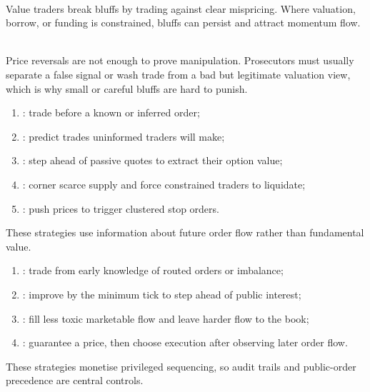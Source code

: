 \documentclass[a4paper,oneside,openany]{book}
\begin{document}
\begin{mechanism} \\
Value traders break bluffs by trading against clear mispricing. Where valuation, borrow, or funding is constrained, bluffs can persist and attract momentum flow.
\end{mechanism}

\begin{caveat} \\
Price reversals are not enough to prove manipulation. Prosecutors must usually separate a false signal or wash trade from a bad but legitimate valuation view, which is why small or careful bluffs are hard to punish.
\end{caveat}

\begin{taxonomy} 
\begin{enumerate}[label=\roman*.]
\setlength{\itemsep}{0pt}
\item {}: trade before a known or inferred order;
\item {}: predict trades uninformed traders will make;
\item {}: step ahead of passive quotes to extract their option value;
\item {}: corner scarce supply and force constrained traders to liquidate;
\item {}: push prices to trigger clustered stop orders.
\end{enumerate}
These strategies use information about future order flow rather than fundamental value.
\end{taxonomy}

\begin{taxonomy} 
\begin{enumerate}[label=\roman*.]
\setlength{\itemsep}{0pt}
\item {}: trade from early knowledge of routed orders or imbalance;
\item {}: improve by the minimum tick to step ahead of public interest;
\item {}: fill less toxic marketable flow and leave harder flow to the book;
\item {}: guarantee a price, then choose execution after observing later order flow.
\end{enumerate}
These strategies monetise privileged sequencing, so audit trails and public-order precedence are central controls.
\end{taxonomy}
\end{document}
